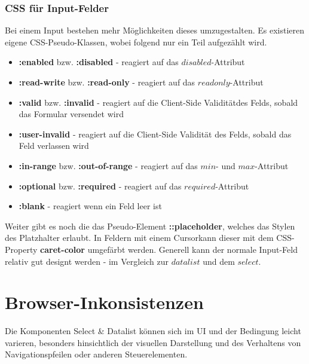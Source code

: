 \subsubsection{CSS für Input-Felder}
Bei einem Input bestehen mehr Möglichkeiten dieses umzugestalten.
Es existieren eigene CSS-Pseudo-Klassen, wobei folgend nur ein Teil aufgezählt wird.

\begin{itemize}
    \item \textbf{:enabled} bzw. \textbf{:disabled} - reagiert auf das $disabled$-Attribut
    \item \textbf{:read-write} bzw. \textbf{:read-only} - reagiert auf das $readonly$-Attribut
    \item \textbf{:valid} bzw. \textbf{:invalid} - reagiert auf die Client-Side Validität\footnotemark des Felds, sobald das Formular versendet wird
    \item \textbf{:user-invalid} - reagiert auf die Client-Side Validität des Felds, sobald das Feld verlassen wird
    \item \textbf{:in-range} bzw. \textbf{:out-of-range} - reagiert auf das $min$- und $max$-Attribut
    \item \textbf{:optional} bzw. \textbf{:required} - reagiert auf das $required$-Attribut
    \item \textbf{:blank} - reagiert wenn ein Feld leer ist
\end{itemize}

Weiter gibt es noch die das Pseudo-Element \textbf{::placeholder}, welches das Stylen des Platzhalter erlaubt.
In Feldern mit einem Cursor\footnotemark kann dieser mit dem CSS-Property \textbf{caret-color} umgefärbt werden.
Generell kann der normale Input-Feld relativ gut designt werden - im Vergleich zur $datalist$ und dem $select$.

\clearpage
\section{Browser-Inkonsistenzen}
Die Komponenten Select \& Datalist können sich im UI und der Bedingung leicht varieren,
besonders hinsichtlich der visuellen Darstellung und des Verhaltens von Navigationspfeilen oder anderen Steuerelementen.



